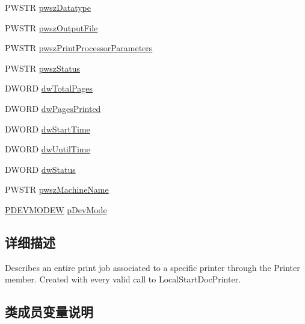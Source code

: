 \begin{DoxyCompactItemize}
\item 
P\+W\+S\+TR \hyperlink{struct___l_o_c_a_l___j_o_b_ab924a327339e88d4ea8084aae1ccde8f}{pwsz\+Datatype}
\item 
P\+W\+S\+TR \hyperlink{struct___l_o_c_a_l___j_o_b_ac22356fe5007c62a908fd6747bacfb3e}{pwsz\+Output\+File}
\item 
P\+W\+S\+TR \hyperlink{struct___l_o_c_a_l___j_o_b_ac4942f4dee67fdbaede82bcc8722158f}{pwsz\+Print\+Processor\+Parameters}
\item 
P\+W\+S\+TR \hyperlink{struct___l_o_c_a_l___j_o_b_a2100790af7f5e99dfd82265899c76347}{pwsz\+Status}
\item 
D\+W\+O\+RD \hyperlink{struct___l_o_c_a_l___j_o_b_a905080b8899cece8627836a9bf9c3898}{dw\+Total\+Pages}
\item 
D\+W\+O\+RD \hyperlink{struct___l_o_c_a_l___j_o_b_a244c1a14b7e6fd8b1af2a6dbb72a4a19}{dw\+Pages\+Printed}
\item 
D\+W\+O\+RD \hyperlink{struct___l_o_c_a_l___j_o_b_a4411bbd75e3601dff01a73191a372bc8}{dw\+Start\+Time}
\item 
D\+W\+O\+RD \hyperlink{struct___l_o_c_a_l___j_o_b_ac72c7ad162013047462123528c9126c2}{dw\+Until\+Time}
\item 
D\+W\+O\+RD \hyperlink{struct___l_o_c_a_l___j_o_b_a01616f2edbbc1c8b23f66e8c2a9accb2}{dw\+Status}
\item 
P\+W\+S\+TR \hyperlink{struct___l_o_c_a_l___j_o_b_a7d0be01c273d544ca7b4f550f27f4252}{pwsz\+Machine\+Name}
\item 
\hyperlink{struct__devicemode_w}{P\+D\+E\+V\+M\+O\+D\+EW} \hyperlink{struct___l_o_c_a_l___j_o_b_ab5b42196180b03ec2e2e4db1374b7013}{p\+Dev\+Mode}
\end{DoxyCompactItemize}


\subsection{详细描述}
Describes an entire print job associated to a specific printer through the Printer member. Created with every valid call to Local\+Start\+Doc\+Printer. 

\subsection{类成员变量说明}
\mbox{\label{struct___l_o_c_a_l___j_o_b_aa3891375c0b26c20d616764c71e3f64b}} 

